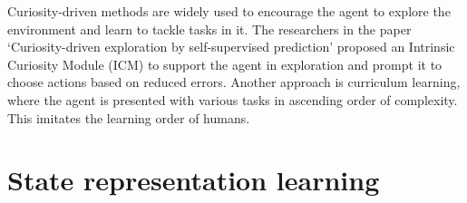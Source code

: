 Curiosity-driven methods are widely used to encourage the agent to explore the
environment and learn to tackle tasks in it. The researchers in the paper
‘Curiosity-driven exploration by self-supervised prediction’ proposed an
Intrinsic Curiosity Module (ICM) to support the agent in exploration and prompt
it to choose actions based on reduced errors. Another approach is curriculum
learning, where the agent is presented with various tasks in ascending order of
complexity. This imitates the learning order of humans. 



\chapter{State representation learning}
\label{ch-srl-background}


